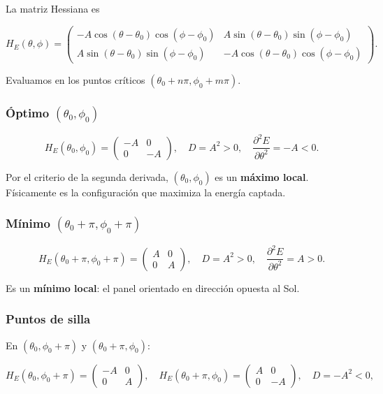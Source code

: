 \documentclass[12pt,a4paper]{article}
\begin{document}
La matriz Hessiana es

\begin{equation}\label{eq:hess}
H_E(\theta,\phi)=
\begin{pmatrix}
-A\cos(\theta-\theta_0)\cos(\phi-\phi_0) &
A\sin(\theta-\theta_0)\sin(\phi-\phi_0) \\[6pt]
A\sin(\theta-\theta_0)\sin(\phi-\phi_0) &
-A\cos(\theta-\theta_0)\cos(\phi-\phi_0)
\end{pmatrix}.
\end{equation}

Evaluamos en los puntos críticos $(\theta_0+n\pi,\phi_0+m\pi)$.

\subsubsection{Óptimo $(\theta_0,\phi_0)$}

\[
H_E(\theta_0,\phi_0)=\begin{pmatrix}-A & 0\\0 & -A\end{pmatrix},
\quad
D = A^2 > 0,\quad
\frac{\partial^2 E}{\partial\theta^2} = -A < 0.
\]

Por el criterio de la segunda derivada, $(\theta_0,\phi_0)$ es un \textbf{máximo local}. Físicamente es la configuración que maximiza la energía captada.

\subsubsection{Mínimo $(\theta_0+\pi,\phi_0+\pi)$}

\[
H_E(\theta_0+\pi,\phi_0+\pi)=\begin{pmatrix}A & 0\\0 & A\end{pmatrix},
\quad
D = A^2 > 0,\quad
\frac{\partial^2 E}{\partial\theta^2} = A > 0.
\]

Es un \textbf{mínimo local}: el panel orientado en dirección opuesta al Sol.

\subsubsection{Puntos de silla}

En $(\theta_0,\phi_0+\pi)$ y $(\theta_0+\pi,\phi_0)$:

\[
H_E(\theta_0,\phi_0+\pi)=\begin{pmatrix}-A & 0\\0 & A\end{pmatrix},
\quad
H_E(\theta_0+\pi,\phi_0)=\begin{pmatrix}A & 0\\0 & -A\end{pmatrix},
\quad
D = -A^2 < 0,
\]
\end{document}

